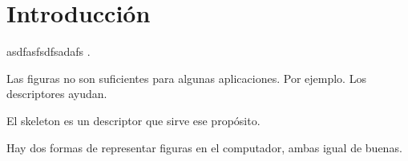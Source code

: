 \chapter{Introducción}
\label{ch:introduction}


 asdfasfsdfsadafs .

Las figuras no son suficientes para algunas aplicaciones. Por ejemplo. Los descriptores ayudan.

El skeleton es un descriptor que sirve ese propósito. 

Hay dos formas de representar figuras en el computador, ambas igual de buenas.

